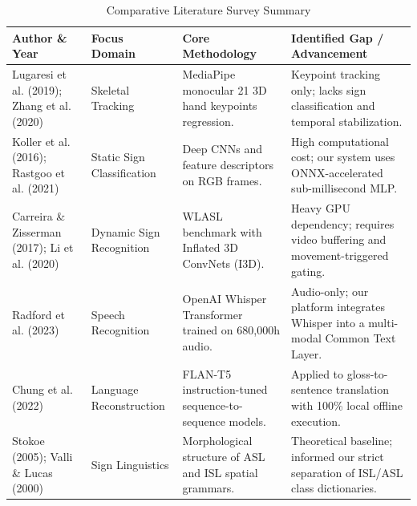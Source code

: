 \documentclass[12pt,a4paper]{report}
\begin{document}
\begin{table}[htbp]
\centering
\caption{Comparative Literature Survey Summary}
\label{tab:lit_survey}
\small
\begin{tabularx}{\textwidth}{P{3.0cm}P{2.6cm}P{3.8cm}L}
\toprule
\textbf{Author \& Year} & \textbf{Focus Domain} & \textbf{Core Methodology} & \textbf{Identified Gap / Advancement} \\
\midrule
Lugaresi et al. (2019); Zhang et al. (2020) & Skeletal Tracking & MediaPipe monocular 21 3D hand keypoints regression. & Keypoint tracking only; lacks sign classification and temporal stabilization. \\
\addlinespace
Koller et al. (2016); Rastgoo et al. (2021) & Static Sign Classification & Deep CNNs and feature descriptors on RGB frames. & High computational cost; our system uses ONNX-accelerated sub-millisecond MLP. \\
\addlinespace
Carreira \& Zisserman (2017); Li et al. (2020) & Dynamic Sign Recognition & WLASL benchmark with Inflated 3D ConvNets (I3D). & Heavy GPU dependency; requires video buffering and movement-triggered gating. \\
\addlinespace
Radford et al. (2023) & Speech Recognition & OpenAI Whisper Transformer trained on 680,000h audio. & Audio-only; our platform integrates Whisper into a multi-modal Common Text Layer. \\
\addlinespace
Chung et al. (2022) & Language Reconstruction & FLAN-T5 instruction-tuned sequence-to-sequence models. & Applied to gloss-to-sentence translation with 100\% local offline execution. \\
\addlinespace
Stokoe (2005); Valli \& Lucas (2000) & Sign Linguistics & Morphological structure of ASL and ISL spatial grammars. & Theoretical baseline; informed our strict separation of ISL/ASL class dictionaries. \\
\bottomrule
\end{tabularx}
\end{table}
\end{document}
